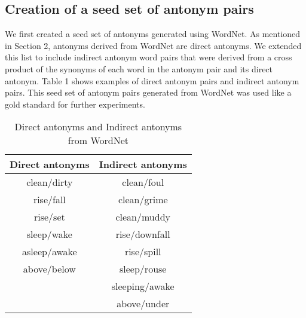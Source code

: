 \documentclass[11pt]{article}
\begin{document}
\subsection{Creation of a seed set of antonym pairs}
We first created a seed set of antonyms generated using WordNet. As mentioned in Section 2, antonyms derived from WordNet are direct antonyms. We extended this list to include indirect antonym word pairs that were derived from a cross product of the synonyms of each word in the antonym pair and its direct antonym. Table 1 shows examples of direct antonym pairs and indirect antonym pairs. This seed set of antonym pairs generated from WordNet was used like a gold standard for further experiments.

\begin{table}
\begin{tabular}[t]{|c|c|}
\hline
Direct antonyms & Indirect antonyms\\
\hline \hline
clean/dirty & clean/foul\\
 rise/fall & clean/grime\\
 rise/set & clean/muddy\\
 sleep/wake & rise/downfall \\
 asleep/awake & rise/spill\\
 above/below & sleep/rouse\\
 & sleeping/awake\\
 & above/under\\
 \hline
\end{tabular}
\caption {Direct antonyms and Indirect antonyms from WordNet}
\end{table}
\end{document}
